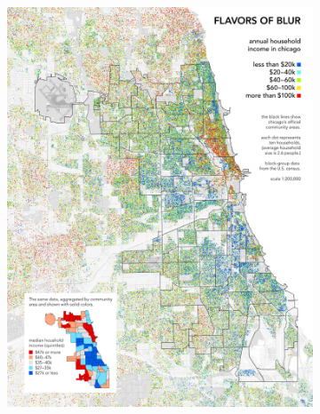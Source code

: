 {\begin{figure}[!h]
\centering
\begin{subfigure}{.5\textwidth}
  \centering
\includegraphics[scale=.35]{figures/chicagodots_income_big.jpg}
\end{subfigure}%
\begin{subfigure}{.5\textwidth}
  \centering

\end{subfigure}
\end{figure}}
